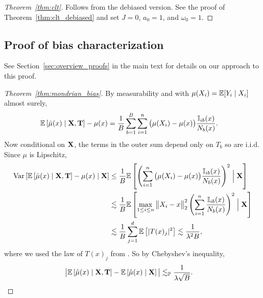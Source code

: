 \begin{proof}[Theorem~\ref{thm:clt}]
  Follows from the debiased version.
  See the proof of Theorem~\ref{thm:clt_debiased} and set $J=0$,
  $a_0 = 1$, and $\omega_0 = 1$.
\end{proof}

\subsection*{Proof of bias characterization}

See Section~\ref{sec:overview_proofs} in the main text
for details on our approach to this proof.

\begin{proof}[Theorem~\ref{thm:mondrian_bias}]


  By measurability and with $\mu(X_i) = \mathbb{E}[Y_i \mid X_i]$ almost surely,
  \begin{align*}
    \mathbb{E} \left[ \hat \mu(x) \mid \mathbf{X}, \mathbf{T} \right]
    - \mu(x)
    &=
    \frac{1}{B}
    \sum_{b=1}^B
    \sum_{i=1}^n \big( \mu(X_i) - \mu(x) \big)
    \frac{\mathbb{I}_{i b}(x)}{N_b(x)}.
  \end{align*}
  Now conditional on $\mathbf{X}$,
  the terms in the outer sum depend only on $T_b$ so are i.i.d.
  Since $\mu$ is Lipschitz,
  \begin{align*}
    \operatorname{Var} \left[
      \mathbb{E} \left[ \hat \mu(x) \mid \mathbf{X}, \mathbf{T} \right]
      - \mu(x)
      \mid \mathbf{X}
    \right]
    &\leq
    \frac{1}{B}
    \mathbb{E} \left[
      \left(
        \sum_{i=1}^n \big( \mu(X_i) - \mu(x) \big)
        \frac{\mathbb{I}_{i b}(x)}{N_b(x)}
      \right)^2
      \Bigm| \mathbf{X}
    \right] \\
    &\lesssim
    \frac{1}{B}
    \mathbb{E} \left[
      \max_{1 \leq i \leq n}
      \big\| X_i - x \big\|_2^2
      \left(
        \sum_{i=1}^n
        \frac{\mathbb{I}_{i b}(x)}{N_b(x)}
      \right)^2
      \Bigm| \mathbf{X}
    \right] \\
    &\lesssim
    \frac{1}{B}
    \sum_{j=1}^{d}
    \mathbb{E} \left[
      |T(x)_j|^2
    \right]
    \lesssim
    \frac{1}{\lambda^2 B},
  \end{align*}
  where we used the law of $T(x)_j$ from
  \citet[Proposition~1]{mourtada2020minimax}.
  So by Chebyshev's inequality,
  \begin{align*}
    \big|
    \mathbb{E} \left[ \hat \mu(x) \mid \mathbf{X}, \mathbf{T} \right]
    - \mathbb{E} \left[ \hat \mu(x) \mid \mathbf{X} \right]
    \big|
    &\lesssim_{\mathbb{P}}
    \frac{1}{\lambda \sqrt B}.
  \end{align*}


\end{proof}
